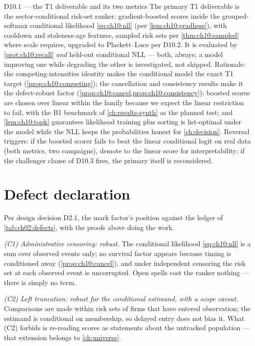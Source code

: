 \begin{decision}{D10.1 --- the T1 deliverable and its two metrics}
The primary T1 deliverable is the sector-conditional risk-set ranker:
gradient-boosted scores inside the grouped-softmax conditional likelihood
\cref{eq:ch10:nll} (per \cref{lem:ch10:gradhess}), with cooldown and
staleness-age features, sampled risk sets per \cref{thm:ch10:sampled}
where scale requires, upgraded to Plackett--Luce per D10.2. It is
evaluated by \cref{prot:ch10:recall} \emph{and} held-out conditional NLL
--- both, always; a model improving one while degrading the other is
investigated, not shipped. Rationale: the competing-intensities identity
makes the conditional model the exact T1 target
(\cref{prop:ch10:competing}); the cancellation and consistency results
make it the defect-robust factor (\cref{prop:ch10:cancel,prop:ch10:consistency});
boosted scores are chosen over linear within the family because we
expect the linear restriction to fail, with the B1 benchmark of
\cref{ch:results-synth} as the planned test; and
\cref{lem:ch10:topk} guarantees likelihood training plus sorting is
list-optimal under the model while the NLL keeps the probabilities
honest for \cref{ch:decision}. Reversal triggers: if the boosted scorer
fails to beat the linear conditional logit on real data (both metrics,
two campaigns), demote to the linear score for interpretability; if the
challenger clause of D10.3 fires, the primary itself is reconsidered.
\end{decision}

\section{Defect declaration}\label{ch10:sec:defects}

Per design decision D2.1, the mark factor's position against the ledger
of \cref{tab:ch02:defects}, with the proofs above doing the work.

\emph{(C1) Administrative censoring: robust.} The conditional likelihood
\cref{eq:ch10:nll} is a sum over observed events only; no survival factor
appears because timing is conditioned away (\cref{prop:ch10:cancel}), and
under independent censoring the risk set at each observed event is
uncorrupted. Open spells cost the ranker nothing --- there is simply no
term.

\emph{(C2) Left truncation: robust for the conditional estimand,
with a scope caveat.} Comparisons are made within risk sets of firms that
have entered observation; the estimand is conditional on membership, so
delayed entry does not bias it. What (C2) forbids is re-reading scores as
statements about the untracked population --- that extension belongs to
\cref{ch:universe}.

